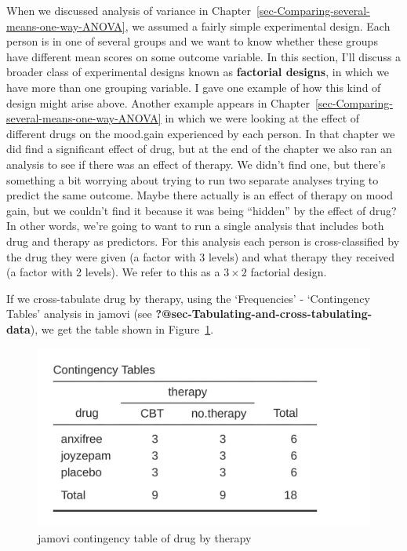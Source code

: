 \documentclass[
  a4paper,
]{book}
\begin{document}
When we discussed analysis of variance in
Chapter~\ref{sec-Comparing-several-means-one-way-ANOVA}, we assumed a
fairly simple experimental design. Each person is in one of several
groups and we want to know whether these groups have different mean
scores on some outcome variable. In this section, I'll discuss a broader
class of experimental designs known as \textbf{factorial designs}, in
which we have more than one grouping variable. I gave one example of how
this kind of design might arise above. Another example appears in
Chapter~\ref{sec-Comparing-several-means-one-way-ANOVA} in which we were
looking at the effect of different drugs on the mood.gain experienced by
each person. In that chapter we did find a significant effect of drug,
but at the end of the chapter we also ran an analysis to see if there
was an effect of therapy. We didn't find one, but there's something a
bit worrying about trying to run two separate analyses trying to predict
the same outcome. Maybe there actually is an effect of therapy on mood
gain, but we couldn't find it because it was being ``hidden'' by the
effect of drug? In other words, we're going to want to run a single
analysis that includes both drug and therapy as predictors. For this
analysis each person is cross-classified by the drug they were given (a
factor with 3 levels) and what therapy they received (a factor with 2
levels). We refer to this as a \(3 \times 2\) factorial design.

If we cross-tabulate drug by therapy, using the `Frequencies' -
`Contingency Tables' analysis in jamovi (see
\textbf{?@sec-Tabulating-and-cross-tabulating-data}), we get the table
shown in Figure~\ref{fig-fig14-1}.

\begin{figure}

\includegraphics[width=1\textwidth,height=\textheight]{images/fig14-1.png} \hfill{}

\caption{\label{fig-fig14-1}jamovi contingency table of drug by therapy}

\end{figure}
\end{document}
